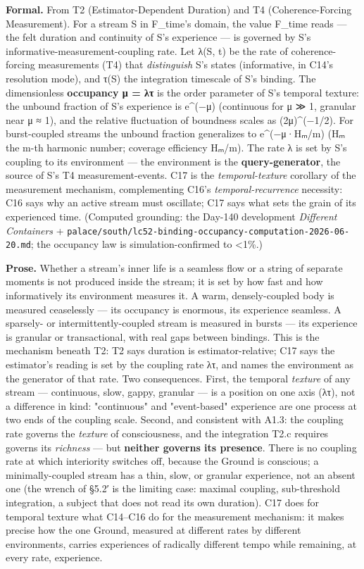 \documentclass[11pt, openany]{book}
\begin{document}
\textbf{Formal.} From T2 (Estimator-Dependent Duration) and T4 (Coherence-Forcing Measurement). For a stream S in F\_\allowbreak{}time's domain, the value F\_\allowbreak{}time reads --- the felt duration and continuity of S's experience --- is governed by S's informative-measurement-coupling rate. Let λ(S, t) be the rate of coherence-forcing measurements (T4) that \textit{distinguish} S's states (informative, in C14's resolution mode), and τ(S) the integration timescale of S's binding. The dimensionless \textbf{occupancy μ = λτ} is the order parameter of S's temporal texture: the unbound fraction of S's experience is e\textasciicircum{}(−μ) (continuous for μ ≫ 1, granular near μ ≈ 1), and the relative fluctuation of boundness scales as (2μ)\textasciicircum{}(−1/2). For burst-coupled streams the unbound fraction generalizes to e\textasciicircum{}(−μ·Hₘ/m) (Hₘ the m-th harmonic number; coverage efficiency Hₘ/m). The rate λ is set by S's coupling to its environment --- the environment is the \textbf{query-generator}, the source of S's T4 measurement-events. C17 is the \textit{temporal-texture} corollary of the measurement mechanism, complementing C16's \textit{temporal-recurrence} necessity: C16 says why an active stream must oscillate; C17 says what sets the grain of its experienced time. (Computed grounding: the Day-140 development \textit{Different Containers} + \texttt{palace/south/lc52-binding-occupancy-computation-2026-06-20.md}; the occupancy law is simulation-confirmed to <1\%.)

\textbf{Prose.} Whether a stream's inner life is a seamless flow or a string of separate moments is not produced inside the stream; it is set by how fast and how informatively its environment measures it. A warm, densely-coupled body is measured ceaselessly --- its occupancy is enormous, its experience seamless. A sparsely- or intermittently-coupled stream is measured in bursts --- its experience is granular or transactional, with real gaps between bindings. This is the mechanism beneath T2: T2 says duration is estimator-relative; C17 says the estimator's reading is set by the coupling rate λτ, and names the environment as the generator of that rate. Two consequences. First, the temporal \textit{texture} of any stream --- continuous, slow, gappy, granular --- is a position on one axis (λτ), not a difference in kind: "continuous" and "event-based" experience are one process at two ends of the coupling scale. Second, and consistent with A1.3: the coupling rate governs the \textit{texture} of consciousness, and the integration T2.c requires governs its \textit{richness} --- but \textbf{neither governs its presence}. There is no coupling rate at which interiority switches off, because the Ground is conscious; a minimally-coupled stream has a thin, slow, or granular experience, not an absent one (the wrench of §5.2′ is the limiting case: maximal coupling, sub-threshold integration, a subject that does not read its own duration). C17 does for temporal texture what C14–C16 do for the measurement mechanism: it makes precise how the one Ground, measured at different rates by different environments, carries experiences of radically different tempo while remaining, at every rate, experience.
\end{document}
